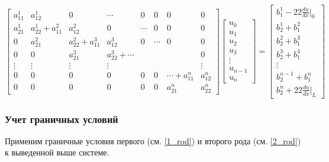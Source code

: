 $$ \begin{bmatrix}
a_{11}^1     &   a_{12}^1         &   0 & \cdots & 0 & 0 & 0  & 0\\
a_{21}^1     &    a_{22}^1+a_{11}^2 & a_{12}^2  & 0 & \cdots & 0 & 0  & 0\\
0     &    a_{21}^2 & a_{22}^2+a_{11}^3  &  a_{12}^3  & 0 & \cdots & 0  & 0\\
0     &    0  & a_{21}^3  & a_{22}^3+ \cdots  &  & &   & 0\\
\vdots & \vdots & \vdots & \vdots &  &  &   & \vdots\\
0 & 0 & 0 & 0 &  0 & 0 & \cdots+a_{11}^n  & a_{12}^n\\
0 & 0 & 0 & 0 &  0 & 0 & a_{21}^n  & a_{22}^n
\end{bmatrix}
\begin{bmatrix}
u_0 \\
u_1 \\
u_2\\
u_3\\
\vdots\\
u_{n-1}\\
u_n
\end{bmatrix} =
\begin{bmatrix}
b_1^1   -22  \frac{du}{dx}|_0 \\
b_2^1+b_1^2\\
b_2^2+b_1^3\\
b_2^3+b_1^4\\
\vdots\\
b_2^{n-1}+b_1^n\\
b_2^n   +22  \frac{du}{dx}|_L
\end{bmatrix}
$$

\subsubsection{Учет граничных условий}

Применим граничные условия первого (см. \ref{1_rod}) и второго рода (см. \ref{2_rod}) к выведенной выше системе.

